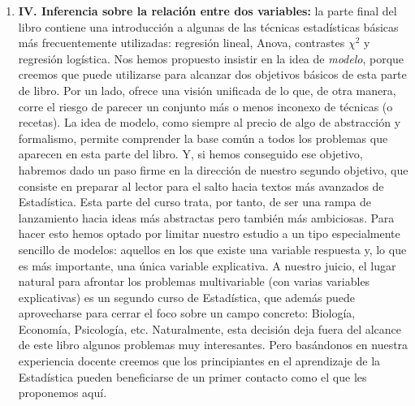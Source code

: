\begin{enumerate}
  \item[]{\bf IV. Inferencia sobre la relación entre dos variables:} la parte final del libro contiene una introducción a algunas de las técnicas estadísticas básicas más frecuentemente utilizadas: regresión lineal, Anova, contrastes $\chi^2$ y regresión logística. Nos hemos propuesto insistir en la idea de {\em modelo}, porque creemos que puede utilizarse para alcanzar dos objetivos básicos de esta parte de libro. Por un lado, ofrece una visión unificada de lo que, de otra manera, corre el riesgo de parecer un conjunto más o menos inconexo de técnicas (o recetas). La idea de modelo, como siempre al precio de algo de abstracción y formalismo, permite comprender la base común a todos los problemas que aparecen en esta parte del libro. Y, si hemos conseguido ese objetivo, habremos dado un paso firme en la dirección de nuestro segundo objetivo, que consiste en preparar al lector para el salto hacia textos más avanzados de Estadística. Esta parte del curso trata, por tanto, de ser una rampa de lanzamiento hacia ideas más abstractas pero también más ambiciosas. Para hacer esto hemos optado por limitar nuestro estudio a un tipo especialmente sencillo de modelos: aquellos en los que existe una variable respuesta y, lo que es más importante, una única variable explicativa. A nuestro juicio, el lugar natural para afrontar los problemas multivariable (con varias variables explicativas) es un segundo curso de Estadística, que además puede aprovecharse para cerrar el foco sobre un campo concreto: Biología, Economía, Psicología, etc. Naturalmente, esta decisión deja fuera del alcance de este libro algunos problemas muy interesantes. Pero basándonos en nuestra experiencia docente creemos que los principiantes en el aprendizaje de la Estadística pueden beneficiarse de un primer contacto como el que les proponemos aquí.

\end{enumerate}

